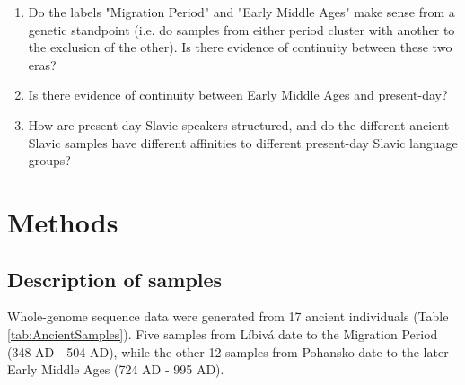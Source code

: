 \begin{enumerate}
\item Do the labels "Migration Period" and "Early Middle Ages" make sense from a genetic standpoint (i.e. do samples from either period cluster with another to the exclusion of the other). Is there evidence of continuity between these two eras?
\item Is there evidence of continuity between Early Middle Ages and present-day?
\item How are present-day Slavic speakers structured, and do the different ancient Slavic samples have different affinities to different present-day Slavic language groups?
\end{enumerate}


\section{Methods}

\subsection{Description of samples}

Whole-genome sequence data were generated from 17 ancient individuals (Table \ref{tab:AncientSamples}). Five samples from Líbivá date to the Migration Period (348 AD - 504 AD), while the other 12 samples from Pohansko date to the later Early Middle Ages (724 AD - 995 AD).

